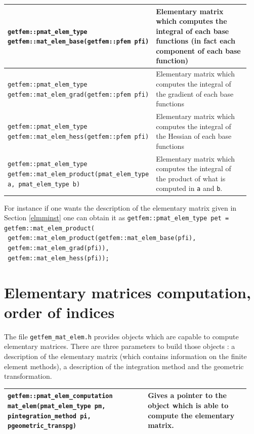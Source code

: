 \documentclass[11pt,a4paper]{article}
\begin{document}
\begin{center} \begin{tabular}{|m{0.55\linewidth}|m{0.4\linewidth}|} \hline
{\tt getfem::pmat\_elem\_type getfem::mat\_elem\_base(getfem::pfem pfi) } & Elementary matrix which computes the integral of each base functions (in fact each component of each base function)\\ \hline
{\tt getfem::pmat\_elem\_type getfem::mat\_elem\_grad(getfem::pfem pfi) } & Elementary matrix which computes the integral of the gradient of each base functions\\ \hline
{\tt getfem::pmat\_elem\_type getfem::mat\_elem\_hess(getfem::pfem pfi) } & Elementary matrix which computes the integral of the Hessian of each base functions\\ \hline
{\tt getfem::pmat\_elem\_type getfem::mat\_elem\_product(pmat\_elem\_type a, pmat\_elem\_type b) } & Elementary matrix which computes the integral of the product of what is computed in {\tt a} and {\tt b}. \\ \hline
\end{tabular} \end{center}

For instance if one wants the description of the elementary matrix given in Section \ref{elmminst} one can obtain it as
{\tt getfem::pmat\_elem\_type pet = getfem::mat\_elem\_product(\\
    $\mbox{}$\hspace{10em} getfem::mat\_elem\_product(getfem::mat\_elem\_base(pfi), \\
     $\mbox{}$\hspace{22.5em}      getfem::mat\_elem\_grad(pfi)),\\
     $\mbox{}$\hspace{22.5em}      getfem::mat\_elem\_hess(pfi));
}


\section{Elementary matrices computation, order of indices}

The file {\tt getfem\_mat\_elem.h} provides objects which are capable to compute elementary matrices.  There are three parameters to build those objects : a description of the elementary matrix (which contains information on the finite element methods), a description of the integration method and the geometric transformation.

\begin{center} \begin{tabular}{|m{0.55\linewidth}|m{0.4\linewidth}|} \hline
{\tt getfem::pmat\_elem\_computation mat\_elem(pmat\_elem\_type pm, pintegration\_method pi, pgeometric\_trans\;pg)} & Gives a pointer to the object which is able to compute the elementary matrix. \\ \hline
\end{tabular} \end{center}
\end{document}

